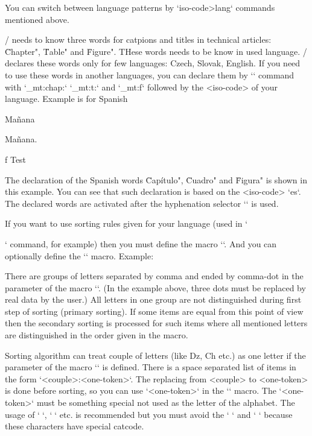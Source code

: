{You can switch between language patterns by `\<iso-code>lang` commands mentioned
above.

\OpTeX/ needs to know three words for catpions and titles in technical
articles: \"Chapter", \"Table" and \"Figure". THese words needs to be know
in used language. \OpTeX/ declares these words only for few languages:
Czech, Slovak, English. If you need to use these words in another languages,
you can declare them by `\sdef` command 
\new
with `_mt:chap:` `_mt:t:` and `_mt:f`
followed by the <iso-code> of your language. Example is for Spanish


\begtt


\eslang %

\sec Mañana

Mañana.

\caption/f Test %

\bye
\endtt

The declaration of the Spanish words \"Capítulo", \"Cuadro" and \"Figura"
is shown in this example. You can see that such declaration is based on the
<iso-code> `es`. The declared words are activated
after the hyphenation selector `\eslang` is used.

If you want to use sorting rules given for your language 
(used in `\makeindex` command, for example) then 
you must define the macro ``. And you can optionally
define the `` macro. Example:

\begtt
\def\sortingdataes {aAäÄáÁ,bB,cCçÇ,^^P^^Q^^R,dD,...,zZ,.}
\def\specsortingdataes {ch:^^P Ch:^^Q CH:^^R}
\endtt

There are groups of letters separated by comma and ended by comma-dot in
the parameter of the macro ``. (In the example above, three dots must
be replaced by real data by the user.) All letters in one group are not
distinguished during first step of sorting (primary sorting). If some items
are equal from this point of view then the secondary sorting is processed
for such items where all mentioned letters are distinguished in the order
given in the macro. 

Sorting algorithm can treat couple of letters (like Dz, Ch etc.) as one letter 
if the parameter of the macro `` is defined. There is
a space separated list of items in the form `<couple>:<one-token>`. The
replacing from <couple> to <one-token> is done before sorting, so you can
use `<one-token>` in the `` macro. The `<one-token>`
must be something special not used as the letter of the alphabet. The usage of
`^^A`, `^^B` etc. is recommended but you must avoid the `^^I` and `^^M` because
these characters have special catcode.

}
